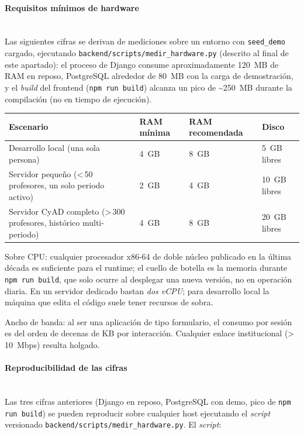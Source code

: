 \paragraph{Requisitos mínimos de hardware}\mbox{}\\
Las siguientes cifras se derivan de mediciones sobre un entorno con \texttt{seed\_demo} cargado, ejecutando \texttt{backend/scripts/medir\_hardware.py} (descrito al final de este apartado): el proceso de Django consume aproximadamente 120~MB de RAM en reposo, PostgreSQL alrededor de 80~MB con la carga de demostración, y el \emph{build} del frontend (\texttt{npm run build}) alcanza un pico de \textasciitilde 250~MB durante la compilación (no en tiempo de ejecución).

\begin{longtable}{p{} p{} p{} p{}}
    \toprule
    \textbf{Escenario} & \textbf{RAM mínima} & \textbf{RAM recomendada} & \textbf{Disco} \\
    \midrule
    \endhead
    Desarrollo local (una sola persona) & 4~GB & 8~GB & 5~GB libres \\
    \midrule
    Servidor pequeño (\textless\,50 profesores, un solo periodo activo) & 2~GB & 4~GB & 10~GB libres \\
    \midrule
    Servidor CyAD completo (\textgreater\,300 profesores, histórico multi-periodo) & 4~GB & 8~GB & 20~GB libres \\
    \bottomrule
\end{longtable}

Sobre CPU: cualquier procesador x86-64 de doble núcleo publicado en la última década es suficiente para el runtime; el cuello de botella es la memoria durante \texttt{npm run build}, que solo ocurre al desplegar una nueva versión, no en operación diaria. En un servidor dedicado bastan \emph{dos vCPU}; para desarrollo local la máquina que edita el código suele tener recursos de sobra.

Ancho de banda: al ser una aplicación de tipo formulario, el consumo por sesión es del orden de decenas de KB por interacción. Cualquier enlace institucional (\textgreater\,10~Mbps) resulta holgado.

\paragraph{Reproducibilidad de las cifras}\mbox{}\\
Las tres cifras anteriores (Django en reposo, PostgreSQL con demo, pico de \texttt{npm run build}) se pueden reproducir sobre cualquier host ejecutando el \emph{script} versionado \texttt{backend/scripts/medir\_hardware.py}. El \emph{script}:

